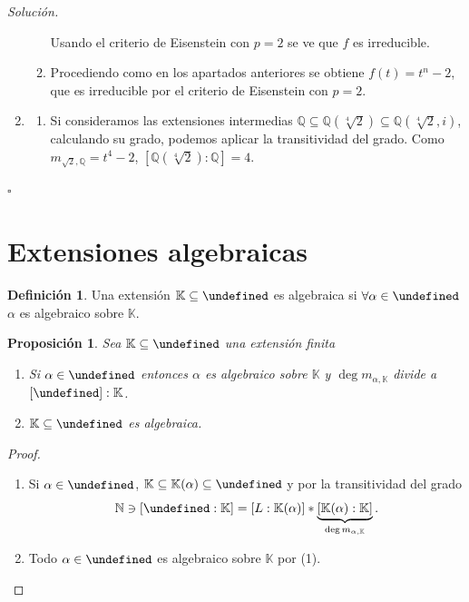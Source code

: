 \documentclass[10pt, spanish]{report}
\newtheorem*{prop}{Proposición}
\theoremstyle{definition}
\newtheorem*{defin}{Definición}
\newenvironment{sol}{\textit{Solución.}}{\hfill$\square$}
\newcommand{\N}{\mathbb{N}}
\newcommand{\Q}{\mathbb{Q}}
\newcommand{\K}{\mathbb{K}}
\let\L\undefined
\newcommand{\L}{\mathbb{L}}
\newcommand{\fecha}[1]{\marginpar{\underline{#1}}}
\begin{document}
\begin{sol}
\begin{enumerate}
\begin{enumerate}
                     Usando el criterio de Eisenstein con $p=2$ se ve que $f$ es
                     irreducible.
                \item Procediendo como en los apartados anteriores se obtiene
                    $f(t)=t^n-2$, que es irreducible por el criterio de
                    Eisenstein con $p=2$.
            \end{enumerate}
        \item
            \begin{enumerate}
                \item Si consideramos las extensiones intermedias
                    $\Q\subseteq\Q(\sqrt[4]{2})\subseteq\Q(\sqrt[4]{2},i)$,
                    calculando su grado, podemos aplicar la transitividad del
                    grado. Como $m_{\sqrt{2},\Q}=t^4-2$,
                    $[\Q(\sqrt[4]{2}):\Q]=4$.
            \end{enumerate}
    \end{enumerate}
\end{sol}
\fecha{1/03}
\section{Extensiones algebraicas}
\begin{defin}
    Una extensión $\K\subseteq\L$ es algebraica si $\forall\alpha\in\L$ $\alpha$
    es algebraico sobre $\K$.
\end{defin}

\begin{prop}
    Sea $\K\subseteq\L$ una extensión finita
    \begin{enumerate}
        \item Si $\alpha\in \L$ entonces $\alpha$ es algebraico sobre $\K$ y
            $\deg{m_{\alpha,\K}}$ divide a $[\L]:\K$.
        \item $\K\subseteq\L$ es algebraica.
    \end{enumerate}
\end{prop}

\begin{proof}\hspace{0pt}
    \begin{enumerate}
        \item Si $\alpha\in\L$,  $\K\subseteq\K(\alpha)\subseteq\L$  y por la
            transitividad del grado
            \[\N\ni[\L:\K]=[L:\K(\alpha)]*\underbrace{[\K(\alpha):\K]}_{\deg{m_{\alpha,\K}}}.\]
        \item Todo $\alpha\in\L$ es algebraico sobre $\K$ por (1).
    \end{enumerate}
\end{proof}
\end{document}

